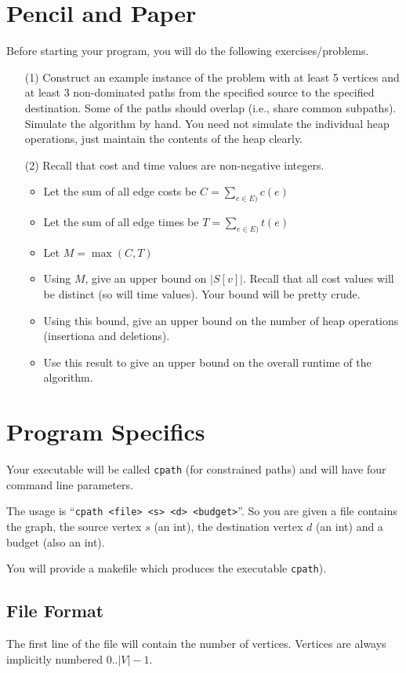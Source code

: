 \section{Pencil and Paper}
Before starting your program, you will do the following exercises/problems.

\begin{itemize}
\item[(1)] Construct an example instance of the problem with
	at least 5 vertices and at least 3 non-dominated paths
	from the specified source to the specified destination.
	Some of the paths should overlap (i.e., share common
	subpaths).
	Simulate the algorithm by hand.  You need not simulate
	the individual heap operations, just maintain the contents
	of the heap clearly.
\item[(2)] Recall that cost and time values are non-negative integers.
	\begin{itemize}
	\item Let the sum of all edge costs be $C=\sum_{e\in E)} c(e)$
	\item Let the sum of all edge times be $T=\sum_{e\in E)} t(e)$
	\item Let $M= \max(C,T)$
	\item Using $M$, give an upper bound on $|S[v]|$.  Recall that
		all cost values will be distinct (so will time values).
		Your bound will be pretty crude.
	\item Using this bound, give an upper bound on the number 
		of heap operations (insertiona and deletions).
	\item Use this result to give an upper bound on the overall
		runtime of the algorithm.
	\end{itemize}
\end{itemize}

\section{Program Specifics}
Your executable will be called \verb+cpath+ (for constrained
paths) and will have four
command line parameters.  

The usage is ``\verb+cpath <file> <s> <d> <budget>+''.
So you are given a file contains the graph, the source
vertex $s$ (an int), the destination vertex $d$ (an int)
and a budget (also an int).

You will provide a makefile which produces the executable
\verb+cpath+).

\subsection*{File Format}
The first line of the file will contain the number
of vertices.  Vertices are always implicitly numbered
$0..|V|-1$.

